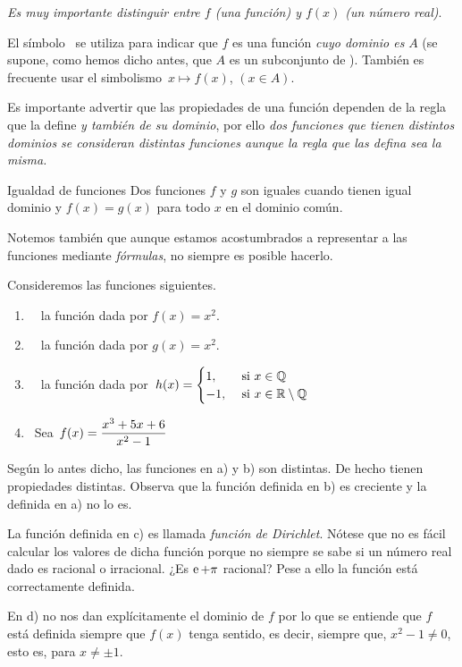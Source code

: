 \documentclass[oneside,spanish,2m,twoside,svgnames,x11names,HTML,12pt]{libro-matua}\usepackage[]{graphicx}\usepackage[]{color}
\begin{document}
\emph{Es muy importante distinguir entre $f$ (una función) y $f(x)$
(un número real)}.

El símbolo \ se utiliza para indicar que $f$
es una función \emph{cuyo dominio es} $A$ (se supone, como hemos
dicho antes, que $A$ es un subconjunto de \R). También es frecuente
usar el simbolismo $\,x\mapsto f(x)$, $(x\in A)$.

Es importante advertir\marginpar{\flushright\curvasr} que las propiedades
de una función dependen de la regla que la define \emph{y también
de su dominio}, por ello \emph{dos funciones que tienen distintos
dominios se consideran distintas funciones aunque la regla que las
defina sea la misma.} 

\begin{defi}{Igualdad de funciones}{} Dos funciones $f$ y $g$ son
iguales cuando tienen igual dominio y $f(x)=g(x)$ para todo $x$
en el dominio común. \end{defi}

Notemos también que aunque estamos acostumbrados a representar a las
funciones mediante \emph{fórmulas}, no siempre es posible hacerlo.
\begin{ejemplo} Consideremos las funciones siguientes. \begin{enumerate}

\item \ \ la función dada por $f(x)=x^{2}$. 

\item \ \ la función dada por $g(x)=x^{2}$. 

\item \ \ la función dada por\ $h(x)=\begin{cases}
1,\  & \text{si \ensuremath{x\in\mathbb Q}}\\
-1,\  & \text{si \ensuremath{x\in\mathbb R\setminus\mathbb Q}}
\end{cases}$ 

\item \ Sea $\,f(x)=\displaystyle\frac{x^{3}+5x+6}{x^{2}-1}$

\end{enumerate} Según lo antes dicho, las funciones en a) y b) son
distintas. De hecho tienen propiedades distintas. Observa que la función
definida en b) es creciente y la definida en a) no lo es.\par La
función definida en c) es llamada \emph{función de Dirichlet}. Nótese
que no es fácil calcular los valores de dicha función porque no siempre
se sabe si un número real dado es racional o irracional. ¿Es $\operatorname{e}+\pi$
racional? Pese a ello la función está correctamente definida.\par En
d) no nos dan explícitamente el dominio de $f$ por lo que se entiende
que $f$ está definida siempre que $f(x)$ tenga sentido, es decir,
siempre que, $x^{2}-1\neq0$, esto es, para $x\neq\pm1$. \end{ejemplo}
\end{document}
